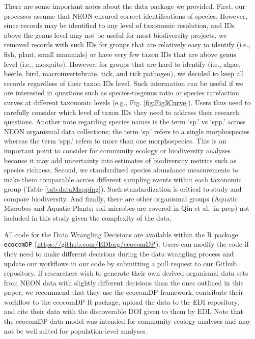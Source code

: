 \documentclass[
  12pt,
]{article}
\begin{document}
There are some important notes about the data package we provided. First, our processes assume that NEON ensured correct identifications of species. However, since records may be identified to any level of taxonomic resolution, and IDs above the genus level may not be useful for most biodiversity projects, we removed records with such IDs for groups that are relatively easy to identify (i.e., fish, plant, small mammals) or have very few taxon IDs that are above genus level (i.e., mosquito). However, for groups that are hard to identify (i.e., algae, beetle, bird, macroinvertebrate, tick, and tick pathogen), we decided to keep all records regardless of their taxon IDs level. Such information can be useful if we are interested in questions such as species-to-genus ratio or species rarefaction curves at different taxonomic levels (e.g., Fig. \ref{fig:Fig3Curve}). Users thus need to carefully consider which level of taxon IDs they need to address their research questions. Another note regarding species names is the term `sp.' vs `spp.' across NEON organismal data collections; the term `sp.' refers to a single morphospecies whereas the term `spp.' refers to more than one morphospecies. This is an important point to consider for community ecology or biodiversity analyses because it may add uncertainty into estimates of biodiversity metrics such as species richness. Second, we standardized species abundance measurements to make them comparable across different sampling events within each taxonomic group (Table \ref{tab:dataMapping}). Such standardization is critical to study and compare biodiversity. And finally, there are other organismal groups (Aquatic Microbes and Aquatic Plants; soil microbes are covered in Qin et al.~in prep) not included in this study given the complexity of the data.

All code for the Data Wrangling Decisions are available within the R package \texttt{ecocomDP} (\url{https://github.com/EDIorg/ecocomDP}). Users can modify the code if they need to make different decisions during the data wrangling process and update our workflows in our code by submitting a pull request to our Github repository. If researchers wish to generate their own derived organismal data sets from NEON data with slightly different decisions than the ones outlined in this paper, we recommend that they use the ecocomDP framework, contribute their workflow to the ecocomDP R package, upload the data to the EDI repository, and cite their data with the discoverable DOI given to them by EDI. Note that the ecocomDP data model was intended for community ecology analyses and may not be well suited for population-level analyses.
\end{document}

